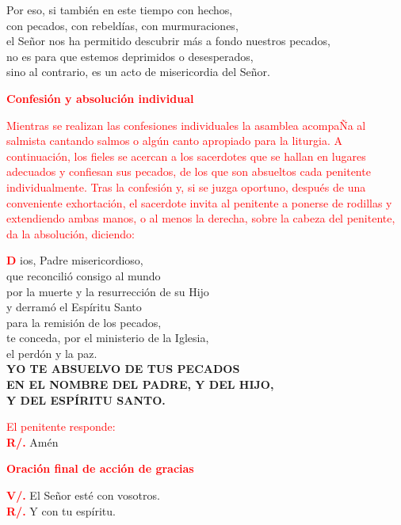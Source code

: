 \documentclass[12pt, letterpaper]{report}
\begin{document}
\noindent
\Large {Por eso, si tambi\'en en este tiempo con hechos,\\
con pecados, con rebeld\'ias, con murmuraciones,\\
el Se\~nor nos ha permitido descubrir m\'as a fondo nuestros pecados,\\
no es para que estemos deprimidos o desesperados,\\
sino al contrario, es un acto de misericordia del Se\~nor.}

\Large {\bfseries \textcolor{red}{Confesi\'on y absoluci\'on individual}}

\large {\textcolor{red}{Mientras se realizan las confesiones individuales la asamblea acompa\~Na al salmista cantando salmos o alg\'un canto apropiado
para la liturgia. A continuaci\'on, los fieles se acercan a los sacerdotes que se hallan en lugares adecuados y confiesan sus pecados, de los que son absueltos cada penitente individualmente. Tras la confesi\'on y, si se juzga oportuno, despu\'es de una conveniente exhortaci\'on, el sacerdote invita al penitente a ponerse de rodillas y extendiendo ambas manos, o al menos la derecha, sobre la cabeza del penitente, da la absoluci\'on, diciendo:}}

\lettrine[lines=2]{\bfseries \textcolor{red}{D}}{} \Large ios, Padre misericordioso,\\
que reconcili\'o consigo al mundo\\
por la muerte y la resurrecci\'on de su Hijo\\
y derram\'o el Esp\'iritu Santo\\
para la remisi\'on de los pecados,\\
te conceda, por el ministerio de la Iglesia,\\
el perd\'on y la paz.\\
{\bfseries YO TE ABSUELVO DE TUS PECADOS\\
EN EL NOMBRE DEL PADRE, Y DEL HIJO,\\
\Huge{\textcolor{red}{}} \Large Y DEL ESP\'IRITU SANTO.}

\large {\textcolor{red}{El penitente responde:}}\\
\noindent
\Large {\bfseries \textcolor{red}{R/.}} \hspace{0.5cm} \Large {Am\'en}

\Large {\bfseries \textcolor{red}{Oraci\'on final de acci\'on de gracias}}

\noindent
\Large {\bfseries \textcolor{red}{V/.}} \hspace{0.5cm} El Se\~nor est\'e con vosotros.\\
\noindent
\Large {\bfseries \textcolor{red}{R/.}} \hspace{0.5cm} Y con tu esp\'iritu.
\end{document}
